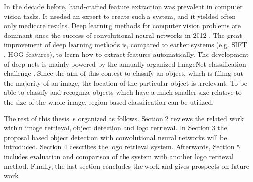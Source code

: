 In the decade before, hand-crafted feature extraction was prevalent in computer vision tasks. It needed an expert to create such a system, and it yielded often only mediocre results. Deep learning methods for computer vision problems are dominant since the success of convolutional neural networks in 2012 \cite{NIPS2012_4824}. The great improvement of deep learning methods is, compared to earlier systems (e.g. SIFT \cite{Lowe:2004:DIF:993451.996342}, HOG \cite{Dalal:2005:HOG:1068507.1069007} features), to learn how to extract features automatically. The development of deep nets is mainly powered by the annually organized ImageNet classification challenge \cite{ILSVRC15}. Since the aim of this contest to classify an object, which is filling out the majority of an image, the location of the particular object is irrelevant. To be able to classify and recognize objects which have a much smaller size relative to the size of the whole image, region based classification can be utilized.

The rest of this thesis is organized as follows. Section 2 reviews the related work within image retrieval, object detection and logo retrieval. In Section 3 the proposal based object detection with convolutional neural networks will be introduced. Section 4 describes the logo retrieval system. Afterwards, Section 5 includes evaluation and comparison of the system with another logo retrieval method. Finally, the last section concludes the work and gives prospects on future work.